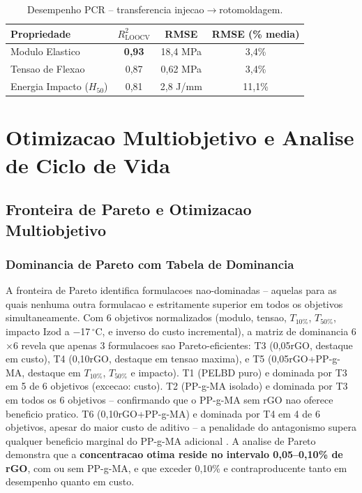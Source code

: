\documentclass[11pt,a4paper,oneside]{article}
\begin{document}
\begin{table}[H]\centering
\caption{Desempenho PCR -- transferencia injecao$\rightarrow$rotomoldagem.}\label{tab:pcr}
\begin{tabular}{lccc}
\toprule
{\bfseries Propriedade} & {\bfseries $R^2_{\text{LOOCV}}$} & {\bfseries RMSE} & {\bfseries RMSE (\% media)} \\
\midrule
Modulo Elastico     & {\bfseries 0,93} & 18,4 MPa & 3,4\% \\
Tensao de Flexao    & 0,87 & 0,62 MPa & 3,4\% \\
Energia Impacto ($H_{50}$) & 0,81 & 2,8 J/mm & 11,1\% \\
\bottomrule
\end{tabular}
\end{table}

\section{Otimizacao Multiobjetivo e Analise de Ciclo de Vida}

\subsection{Fronteira de Pareto e Otimizacao Multiobjetivo}\label{sec:otimizacao}

\subsubsection{Dominancia de Pareto com Tabela de Dominancia}

A fronteira de Pareto \cite{Pareto1906} identifica formulacoes nao-dominadas -- aquelas para as quais nenhuma outra formulacao e estritamente superior em todos os objetivos simultaneamente. Com 6 objetivos normalizados (modulo, tensao, $T_{10\%}$, $T_{50\%}$, impacto Izod a $-$17$\,^{\circ}$C, e inverso do custo incremental), a matriz de dominancia 6$\times$6 revela que apenas 3 formulacoes sao Pareto-eficientes: T3 (0,05rGO, destaque em custo), T4 (0,10rGO, destaque em tensao maxima), e T5 (0,05rGO+PP-g-MA, destaque em $T_{10\%}$, $T_{50\%}$ e impacto). T1 (PELBD puro) e dominada por T3 em 5 de 6 objetivos (excecao: custo). T2 (PP-g-MA isolado) e dominada por T3 em todos os 6 objetivos -- confirmando que o PP-g-MA sem rGO nao oferece beneficio pratico. T6 (0,10rGO+PP-g-MA) e dominada por T4 em 4 de 6 objetivos, apesar do maior custo de aditivo -- a penalidade do antagonismo supera qualquer beneficio marginal do PP-g-MA adicional \cite{Natarajan2020}. A analise de Pareto demonstra que a {\bfseries concentracao otima reside no intervalo 0,05--0,10\% de rGO}, com ou sem PP-g-MA, e que exceder 0,10\% e contraproducente tanto em desempenho quanto em custo.
\end{document}
